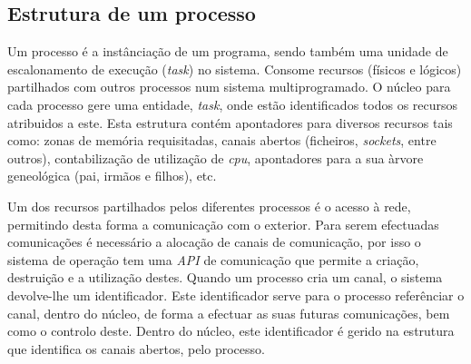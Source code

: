 
\subsection{Estrutura de um processo}

Um processo é a instânciação de um programa, sendo também uma unidade de escalonamento de execução (\textit{task}) no sistema.
Consome recursos (físicos e lógicos) partilhados com outros processos num sistema multiprogramado.
O núcleo para cada processo gere uma entidade, \textit{task}, onde estão identificados todos os recursos atribuidos a este.
Esta estrutura contém apontadores para diversos recursos tais como: zonas de memória requisitadas, canais abertos (ficheiros, \textit{sockets}, entre outros), contabilização de utilização de \textit{cpu}, apontadores para a sua àrvore geneológica (pai, irmãos e filhos), etc.

Um dos recursos partilhados pelos diferentes processos é o acesso à rede, permitindo desta forma a comunicação com o exterior.
Para serem efectuadas comunicações é necessário a alocação de canais de comunicação, por isso o sistema de operação tem uma \textit{API} de comunicação que permite a criação, destruição e a utilização destes.
Quando um processo cria um canal, o sistema devolve-lhe um identificador.
Este identificador serve para o processo referênciar o canal, dentro do núcleo, de forma a efectuar as suas futuras comunicações, bem como o controlo deste.
Dentro do núcleo, este identificador é gerido na estrutura que identifica os canais abertos, pelo processo.






